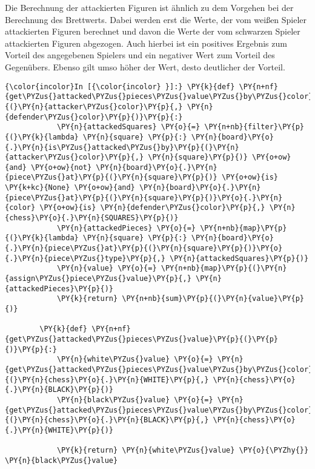 Die Berechnung der attackierten Figuren ist ähnlich zu dem Vorgehen bei
der Berechnung des Brettwerts. Dabei werden erst die Werte, der vom
weißen Spieler attackierten Figuren berechnet und davon die Werte der
vom schwarzen Spieler attackierten Figuren abgezogen. Auch hierbei ist
ein positives Ergebnis zum Vorteil des angegebenen Spielers und ein
negativer Wert zum Vorteil des Gegenübers. Ebenso gilt umso höher der
Wert, desto deutlicher der Vorteil.

    \begin{Verbatim}[commandchars=\\\{\}]
{\color{incolor}In [{\color{incolor} }]:} \PY{k}{def} \PY{n+nf}{get\PYZus{}attacked\PYZus{}pieces\PYZus{}value\PYZus{}by\PYZus{}color}\PY{p}{(}\PY{n}{attacker\PYZus{}color}\PY{p}{,} \PY{n}{defender\PYZus{}color}\PY{p}{)}\PY{p}{:}
            \PY{n}{attackedSquares} \PY{o}{=} \PY{n+nb}{filter}\PY{p}{(}\PY{k}{lambda} \PY{n}{square} \PY{p}{:} \PY{n}{board}\PY{o}{.}\PY{n}{is\PYZus{}attacked\PYZus{}by}\PY{p}{(}\PY{n}{attacker\PYZus{}color}\PY{p}{,} \PY{n}{square}\PY{p}{)} \PY{o+ow}{and} \PY{o+ow}{not} \PY{n}{board}\PY{o}{.}\PY{n}{piece\PYZus{}at}\PY{p}{(}\PY{n}{square}\PY{p}{)} \PY{o+ow}{is} \PY{k+kc}{None} \PY{o+ow}{and} \PY{n}{board}\PY{o}{.}\PY{n}{piece\PYZus{}at}\PY{p}{(}\PY{n}{square}\PY{p}{)}\PY{o}{.}\PY{n}{color} \PY{o+ow}{is} \PY{n}{defender\PYZus{}color}\PY{p}{,} \PY{n}{chess}\PY{o}{.}\PY{n}{SQUARES}\PY{p}{)}
            \PY{n}{attackedPieces} \PY{o}{=} \PY{n+nb}{map}\PY{p}{(}\PY{k}{lambda} \PY{n}{square} \PY{p}{:} \PY{n}{board}\PY{o}{.}\PY{n}{piece\PYZus{}at}\PY{p}{(}\PY{n}{square}\PY{p}{)}\PY{o}{.}\PY{n}{piece\PYZus{}type}\PY{p}{,} \PY{n}{attackedSquares}\PY{p}{)}
            \PY{n}{value} \PY{o}{=} \PY{n+nb}{map}\PY{p}{(}\PY{n}{assign\PYZus{}piece\PYZus{}value}\PY{p}{,} \PY{n}{attackedPieces}\PY{p}{)}
            \PY{k}{return} \PY{n+nb}{sum}\PY{p}{(}\PY{n}{value}\PY{p}{)}
             
        \PY{k}{def} \PY{n+nf}{get\PYZus{}attacked\PYZus{}pieces\PYZus{}value}\PY{p}{(}\PY{p}{)}\PY{p}{:}
            \PY{n}{white\PYZus{}value} \PY{o}{=} \PY{n}{get\PYZus{}attacked\PYZus{}pieces\PYZus{}value\PYZus{}by\PYZus{}color}\PY{p}{(}\PY{n}{chess}\PY{o}{.}\PY{n}{WHITE}\PY{p}{,} \PY{n}{chess}\PY{o}{.}\PY{n}{BLACK}\PY{p}{)}
            \PY{n}{black\PYZus{}value} \PY{o}{=} \PY{n}{get\PYZus{}attacked\PYZus{}pieces\PYZus{}value\PYZus{}by\PYZus{}color}\PY{p}{(}\PY{n}{chess}\PY{o}{.}\PY{n}{BLACK}\PY{p}{,} \PY{n}{chess}\PY{o}{.}\PY{n}{WHITE}\PY{p}{)}
            
            \PY{k}{return} \PY{n}{white\PYZus{}value} \PY{o}{\PYZhy{}} \PY{n}{black\PYZus{}value}
\end{Verbatim}

